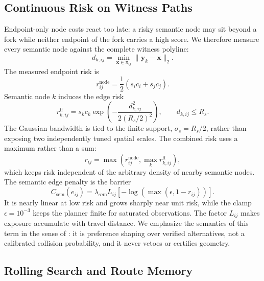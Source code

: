 \documentclass[letterpaper,10pt,conference]{ieeeconf}
\newcommand{\vect}[1]{\boldsymbol{#1}}
\begin{document}
\subsection{Continuous Risk on Witness Paths}
Endpoint-only node costs react too late: a risky semantic node may sit beyond
a fork while neither endpoint of the fork carries a high score.  We therefore
measure every semantic node against the complete witness polyline:
\begin{equation}
 d_{k,ij}=\min_{\vect{x}\in\pi_{ij}}
             \|\vect{y}_k-\vect{x}\|_2.
\label{eq:anchor_distance}
\end{equation}
The measured endpoint risk is
\begin{equation}
 r^{\mathrm{node}}_{ij}=\frac{1}{2}(s_i c_i+s_j c_j).
\end{equation}
Semantic node $k$ induces the edge risk
\begin{equation}
 r^{\mathrm{ff}}_{k,ij}=s_kc_k
 \exp\left(-\frac{d_{k,ij}^2}{2(R_s/2)^2}\right),
 \qquad d_{k,ij}\le R_s.
\label{eq:field}
\end{equation}
The Gaussian bandwidth is tied to the finite support, $\sigma_s=R_s/2$,
rather than exposing two independently tuned spatial scales.  The combined
risk uses a maximum rather than a sum:
\begin{equation}
 r_{ij}=\max\left(r^{\mathrm{node}}_{ij},
                  \max_k r^{\mathrm{ff}}_{k,ij}\right),
\label{eq:risk}
\end{equation}
which keeps risk independent of the arbitrary density of nearby semantic
nodes.  The semantic edge penalty is the barrier
\begin{equation}
 C_{\mathrm{sem}}(e_{ij})=
 \lambda_{\mathrm{sem}}L_{ij}[-\log(\max(\epsilon,1-r_{ij}))].
\label{eq:semantic_cost}
\end{equation}
It is nearly linear at low risk and grows sharply near unit risk, while the
clamp $\epsilon=10^{-3}$ keeps the planner finite for saturated observations.
The factor $L_{ij}$ makes exposure accumulate with travel distance.  We
emphasize the semantics of this term in the sense of \cite{majumdar}: it is
preference shaping over verified alternatives, not a calibrated collision
probability, and it never vetoes or certifies geometry.

\subsection{Rolling Search and Route Memory}
\end{document}
